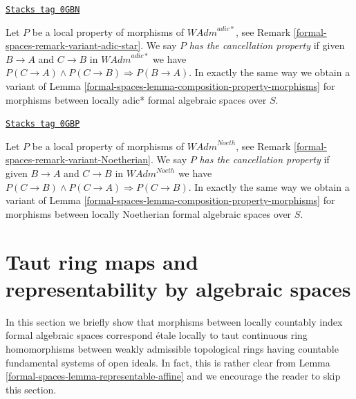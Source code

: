 \begin{remark}

\label{formal-spaces-remark-permanence-variant-adic-star}
\href{https://stacks.math.columbia.edu/tag/0GBN}{\texttt{Stacks tag 0GBN}}

Let $P$ be a local property of morphisms of $\textit{WAdm}^{adic*}$, see
Remark \ref{formal-spaces-remark-variant-adic-star}. We say $P$ {\it has the cancellation
property} if given $B \to A$ and $C \to B$ in $\textit{WAdm}^{adic*}$
we have $P(C \to A) \wedge P(C \to B) \Rightarrow P(B \to A)$.
In exactly the same way we obtain a variant of
Lemma \ref{formal-spaces-lemma-composition-property-morphisms}
for morphisms between locally adic* formal algebraic spaces over $S$.
\end{remark}

\begin{remark}

\label{formal-spaces-remark-permanence-variant-Noetherian}
\href{https://stacks.math.columbia.edu/tag/0GBP}{\texttt{Stacks tag 0GBP}}

Let $P$ be a local property of morphisms of $\textit{WAdm}^{Noeth}$, see
Remark \ref{formal-spaces-remark-variant-Noetherian}. We say $P$
{\it has the cancellation property} if given $B \to A$ and $C \to B$
in $\textit{WAdm}^{Noeth}$ we have
$P(C \to B) \wedge P(C \to A) \Rightarrow P(C \to B)$.
In exactly the same way we obtain a variant of
Lemma \ref{formal-spaces-lemma-composition-property-morphisms}
for morphisms between locally Noetherian formal algebraic spaces over $S$.
\end{remark}

\section{Taut ring maps and representability by algebraic spaces}
\label{formal-spaces-section-taut}
In this section we briefly show that morphisms between
locally countably index formal algebraic spaces correspond \'etale locally
to taut continuous ring homomorphisms between weakly admissible
topological rings having countable fundamental systems of open ideals.
In fact, this is rather clear from
Lemma \ref{formal-spaces-lemma-representable-affine}
and we encourage the reader to skip this section.

